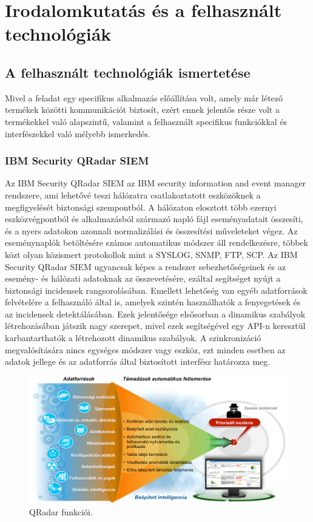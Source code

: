 \chapter{Irodalomkutatás és a felhasznált technológiák}
\label{ch:tech}
\section{A felhasznált technológiák ismertetése}
Mivel a feladat egy specifikus alkalmazás előállítása volt, amely már létező termékek közötti kommunikációt biztosít, ezért ennek jelentős része volt a termékekkel való alapszintű, valamint a felhasznált specifikus funkciókkal és interfészekkel való mélyebb ismerkedés.


\subsection{IBM Security QRadar SIEM}
\label{subsec:qradar}
Az IBM Security QRadar SIEM az IBM security information and event manager rendszere, ami lehetővé teszi hálózatra csatlakoztatott eszközöknek a megfigyelését biztonsági szempontból. A hálózaton elosztott több ezernyi eszközvégpontból és alkalmazásból származó napló fájl eseményadatait összesíti, és a nyers adatokon azonnali normalizálási és összesítési műveleteket végez. Az eseménynaplók betöltésére számos automatikus módszer áll rendelkezésre, többek közt olyan közismert protokollok mint a SYSLOG, SNMP, FTP, SCP. Az IBM Security QRadar SIEM ugyancsak képes a rendszer sebezhetőségeinek és az esemény- és hálózati adatoknak az összevetésére, ezáltal segítséget nyújt a biztonsági incidensek rangsorolásában. Emellett lehetőség van egyéb adatforrások felvételére a felhasználó által is, amelyek szintén használhatók a fenyegetések és az incidensek detektálásában. Ezek jelentősége elsősorban a dinamikus szabályok létrehozásában játszik nagy szerepet, mivel ezek segítségével egy API-n keresztül karbantarthatók a létrehozott dinamikus szabályok. A szinkronizáció megvalósítására nincs egységes módszer vagy eszköz, ezt minden esetben az adatok jellege és az adatforrás által biztosított interfész határozza meg.

\begin{figure}
	\centering
	\includegraphics[width=0.9\linewidth]{figures/QRadar_promo.png}
	\caption{QRadar funkciói.}
	\label{fig:qradar-promo}
\end{figure}

